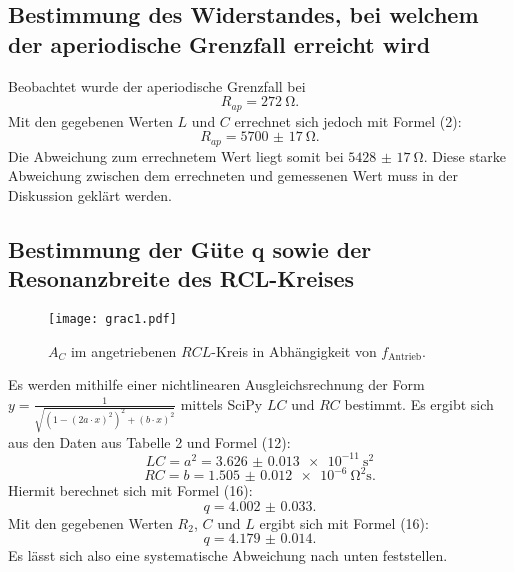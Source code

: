 \subsection{Bestimmung des Widerstandes, bei welchem der aperiodische Grenzfall erreicht wird}
Beobachtet wurde der aperiodische Grenzfall bei
\begin{displaymath}
R_{ap} = \SI{272}{\ohm}\text{.}
\end{displaymath}
Mit den gegebenen Werten $L$ und $C$ errechnet sich jedoch mit Formel (2):
\begin{displaymath}
R_{ap} = \SI{5700(17)}{\ohm}\text{.}
\end{displaymath}
Die Abweichung zum errechnetem Wert liegt somit bei $\SI{5428(17)}{\ohm}$. 
Diese starke Abweichung zwischen dem errechneten und gemessenen Wert muss in der Diskussion geklärt werden.


\subsection{Bestimmung der Güte q sowie der Resonanzbreite des RCL-Kreises}
\begin{figure}[H]
	\centering
	\caption{$A_C$ im angetriebenen $RCL$-Kreis in Abhängigkeit von $f_{\text{Antrieb}}$.}
	\texttt{[image: grac1.pdf]}
	\label{fig:grac1}
\end{figure}
Es werden mithilfe einer nichtlinearen Ausgleichsrechnung der Form $y=\frac{1}{\sqrt{(1-(2a\cdot x)^2)^2+(b\cdot x)^2}} $ mittels SciPy \cite{scipy} $LC$ und $RC$ bestimmt. Es ergibt sich aus den Daten aus Tabelle 2 und Formel (12): 
\begin{displaymath}
LC = a^2 = \SI{3.626(13)e-11}{\second\squared}
\end{displaymath}
\begin{displaymath}
RC = b = \SI{1.505(12)e-6}{\ohm\squared\second}\text{.}
\end{displaymath}
Hiermit berechnet sich mit Formel (16):
\begin{displaymath}
q = \num{4.002(33)}\text{.}
\end{displaymath}
Mit den gegebenen Werten $R_2$, $C$ und $L$ ergibt sich mit Formel (16):
\begin{displaymath}
q = \num{4.179(14)}\text{.}
\end{displaymath}
Es lässt sich also eine systematische Abweichung  nach unten feststellen.


